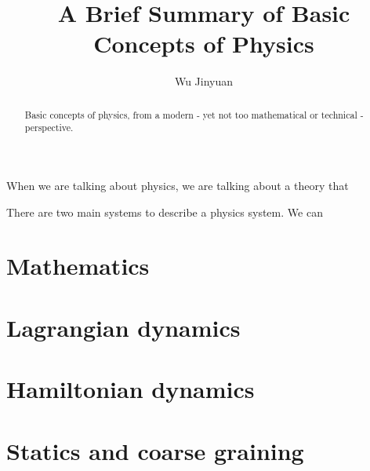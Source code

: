 \documentclass[a4paper]{article}
\title{A Brief Summary of Basic Concepts of Physics}
\author{Wu Jinyuan}
\begin{document}
\maketitle

\begin{abstract}
    Basic concepts of physics, from a modern - yet not too mathematical or technical - perspective.
\end{abstract}

When we are talking about physics, we are talking about a theory that 

There are two main systems to describe a physics system. We can 

\section{Mathematics}

\section{Lagrangian dynamics}

\section{Hamiltonian dynamics}

\section{Statics and coarse graining}
\end{document}
